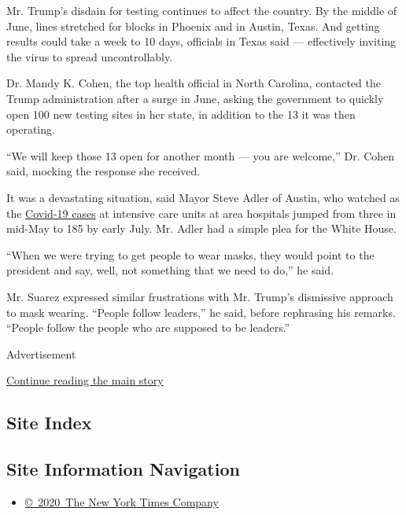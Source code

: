Mr. Trump's disdain for testing continues to affect the country. By the
middle of June, lines stretched for blocks in Phoenix and in Austin,
Texas. And getting results could take a week to 10 days, officials in
Texas said --- effectively inviting the virus to spread uncontrollably.

Dr. Mandy K. Cohen, the top health official in North Carolina, contacted
the Trump administration after a surge in June, asking the government to
quickly open 100 new testing sites in her state, in addition to the 13
it was then operating.

``We will keep those 13 open for another month --- you are welcome,''
Dr. Cohen said, mocking the response she received.

It was a devastating situation, said Mayor Steve Adler of Austin, who
watched as the
\href{https://dshs.texas.gov/coronavirus/additionaldata.aspx}{Covid-19
cases} at intensive care units at area hospitals jumped from three in
mid-May to 185 by early July. Mr. Adler had a simple plea for the White
House.

``When we were trying to get people to wear masks, they would point to
the president and say, well, not something that we need to do,'' he
said.

Mr. Suarez expressed similar frustrations with Mr. Trump's dismissive
approach to mask wearing. ``People follow leaders,'' he said, before
rephrasing his remarks. ``People follow the people who are supposed to
be leaders.''

Advertisement

\protect\hyperlink{after-bottom}{Continue reading the main story}

\hypertarget{site-index}{%
\subsection{Site Index}\label{site-index}}

\hypertarget{site-information-navigation}{%
\subsection{Site Information
Navigation}\label{site-information-navigation}}

\begin{itemize}
\tightlist
\item
  \href{https://help.nytimes3xbfgragh.onion/hc/en-us/articles/115014792127-Copyright-notice}{©~2020~The
  New York Times Company}
\end{itemize}

